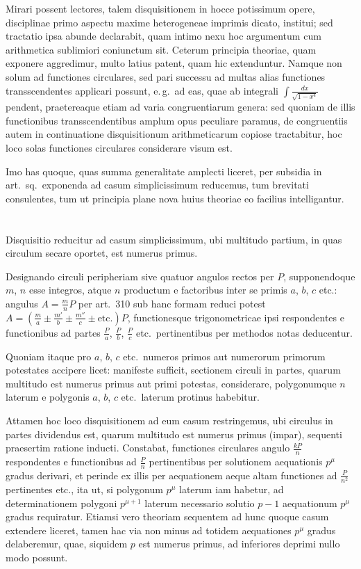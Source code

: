 \documentclass[12pt,a4paper]{article}
\theoremstyle{plain}
\theoremstyle{definition}
\theoremstyle{remark}
\begin{document}
Mirari possent lectores, talem disquisitionem in hocce potissimum opere, disciplinae primo aspectu maxime heterogeneae imprimis dicato, institui; sed tractatio ipsa abunde declarabit, quam intimo nexu hoc argumentum cum arithmetica sublimiori coniunctum sit. Ceterum principia theoriae, quam exponere aggredimur, multo latius patent, quam hic extenduntur. Namque non solum ad functiones circulares, sed pari successu ad multas alias functiones transscendentes applicari possunt, e.\,g.\ ad eas, quae ab integrali $\int\frac{dx}{\sqrt{1-x^4}}$ pendent, praetereaque etiam ad varia congruentiarum genera: sed quoniam de illis functionibus transscendentibus amplum opus peculiare paramus, de congruentiis autem in continuatione disquisitionum arithmeticarum copiose tractabitur, hoc loco solas functiones circulares considerare visum est.

Imo has quoque, quas summa generalitate amplecti liceret, per subsidia in art.\ sq.\ exponenda ad casum simplicissimum reducemus, tum brevitati consulentes, tum ut principia plane nova huius theoriae eo facilius intelligantur.

\section{}

Disquisitio reducitur ad casum simplicissimum, ubi multitudo partium, in quas circulum secare oportet, est numerus primus.

Designando circuli peripheriam sive quatuor angulos rectos per $P$, supponendoque $m$, $n$ esse integros, atque $n$ productum e factoribus inter se primis $a$, $b$, $c$ etc.: angulus $A=\frac{m}{n}P$ per art.\ 310 sub hanc formam reduci potest $A=(\frac{m}{a}\pm\frac{m'}{b}\pm\frac{m''}{c}\pm\text{etc.})P$, functionesque trigonometricae ipsi respondentes e functionibus ad partes $\frac{P}{a}$, $\frac{P}{b}$, $\frac{P}{c}$ etc.\ pertinentibus per methodos notas deducentur.

Quoniam itaque pro $a$, $b$, $c$ etc.\ numeros primos aut numerorum primorum potestates accipere licet: manifeste sufficit, sectionem circuli in partes, quarum multitudo est numerus primus aut primi potestas, considerare, polygonumque $n$ laterum e polygonis $a$, $b$, $c$ etc.\ laterum protinus habebitur.

Attamen hoc loco disquisitionem ad eum casum restringemus, ubi circulus in partes dividendus est, quarum multitudo est numerus primus (impar), sequenti praesertim ratione inducti. Constabat, functiones circulares angulo $\frac{kP}{n}$ respondentes e functionibus ad $\frac{P}{n}$ pertinentibus per solutionem aequationis $p^\mu$ gradus derivari, et perinde ex illis per aequationem aeque altam functiones ad $\frac{P}{n^2}$ pertinentes etc., ita ut, si polygonum $p^\mu$ laterum iam habetur, ad determinationem polygoni $p^{\mu+1}$ laterum necessario solutio $p-1$ aequationum $p^\mu$ gradus requiratur. Etiamsi vero theoriam sequentem ad hunc quoque casum extendere liceret, tamen hac via non minus ad totidem aequationes $p^\mu$ gradus delaberemur, quae, siquidem $p$ est numerus primus, ad inferiores deprimi nullo modo possunt.
\end{document}
